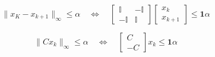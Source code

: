 \newpar{}
\begin{equation*}
    \|x_K - x_{k+1}\|_\infty \leq \alpha \quad \Leftrightarrow \quad \begin{bmatrix}
        \mathbb{I}  & -\mathbb{I} \\
        -\mathbb{I} & \mathbb{I}
    \end{bmatrix}\begin{bmatrix}
        x_k \\
        x_{k+1}
    \end{bmatrix} \leq \bm{1} \alpha
\end{equation*}

\newpar{}

\begin{equation*}
    \|C x_k\|_\infty \leq \alpha \quad \Leftrightarrow \quad \begin{bmatrix}
        C \\ -C
    \end{bmatrix} x_k \leq \bm{1} \alpha
\end{equation*}